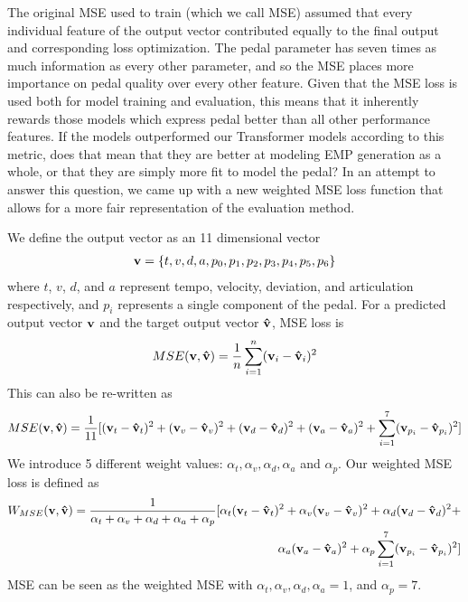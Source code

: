 The original MSE used to train \vnet{} (which we call \vnet{} MSE) assumed that every individual feature of the output vector contributed equally to the final output and corresponding loss optimization. The pedal parameter has seven times as much information as every other parameter, and so the \vnetf{} MSE places more importance on pedal quality over every other feature. Given that the \vnetf{} MSE loss is used both for model training and evaluation, this means that it inherently rewards those models which express pedal better than all other performance features. If the \vnet{} models outperformed our Transformer models according to this metric, does that mean that they are better at modeling EMP generation as a whole, or that they are simply more fit to model the pedal? In an attempt to answer this question, we came up with a new weighted MSE loss function that allows for a more fair representation of the evaluation method. 

\newcommand{\rvec}[1]{\mb{#1}}

\newcommand{\vn}{\rvec{v}}
\newcommand{\vh}{\rvec{\hat{v}}}

\newcommand{\df}[1]{(\vn_{#1} - \vh_{#1})^2}

\newcommand{\al}[1]{\alpha_{#1}}

We define the output vector as an 11 dimensional vector 
\begin{align*}
\rvec{v} = \{t, v, d, a, p_0, p_1, p_2, p_3, p_4, p_5, p_6\}   
\end{align*}
where $t$, $v$, $d$, and $a$ represent tempo, velocity, deviation, and articulation respectively, and $p_i$ represents a single component of the pedal. For a predicted output vector $\vn$ and the target output vector $\vh$, \vnetf{} MSE loss is 
\begin{align*}
MSE(\vn, \vh) = \frac{1}{n}\sum_{i=1}^{n}(\vn_i - \vh_i)^2   
\end{align*}
This can also be re-written as 
\begin{align*}
MSE(\vn, \vh) = \frac{1}{11}[\df{t} + \df{v} + \df{d} + \df{a} + \sum_{i=1}^{7}(\vn_{p_{i}} - \vh_{p_{i}})^2]   
\end{align*}
We introduce 5 different weight values: $\al{t}, \al{v}, \al{d}, \al{a}$ and $\al{p}$. Our weighted MSE loss is defined as 
\begin{align*}
W_{MSE}(\vn, \vh) = \frac{1}{\al{t} + \al{v} + \al{d} + \al{a} + \al{p}}[\al{t}\df{t} + \al{v}\df{v} + \al{d}\df{d} + \\
\al{a}\df{a} + \al{p}\sum_{i=1}^{7}(\vn_{p_{i}} - \vh_{p_{i}})^2 ]   
\end{align*}
\vnetf{} MSE can be seen as the weighted MSE with $\al{t}, \al{v}, \al{d}, \al{a} = 1$, and $\al{p} = 7$. 

